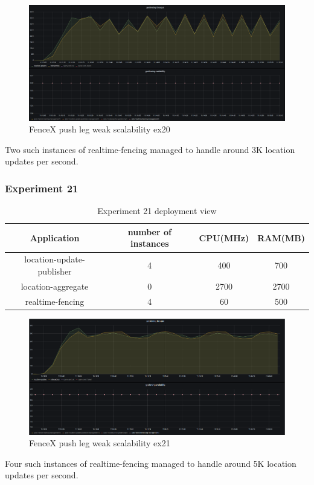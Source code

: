 \documentclass[a4]{report}
\begin{document}
    \begin{figure}[h!]
        \caption{FenceX push leg weak scalability ex20}
        \label{fig:ex20}
        \includegraphics[scale=0.4]{images/evaluation/ex20-benchmarking-ongoing-1per10sec.png}
    \end{figure}

    Two such instances of realtime-fencing managed to handle around 3K location updates per second.

    \clearpage

    \subsubsection{Experiment 21}
    \begin{table}[h!]
        \centering
        \begin{tabular}{|c|c|c|c|}
            \hline
            Application               & number of instances & CPU(MHz) & RAM(MB) \\
            \hline
            location-update-publisher & 4                   & 400      & 700     \\
            location-aggregate        & 0                   & 2700     & 2700    \\
            realtime-fencing          & 4                   & 60       & 500     \\
            \hline
        \end{tabular}
        \caption{Experiment 21 deployment view}
        \label{table:ex21-dv}
    \end{table}

    \begin{figure}[h!]
        \caption{FenceX push leg weak scalability ex21}
        \label{fig:ex21}
        \includegraphics[scale=0.4]{images/evaluation/ex21-benchmarking-ongoing-1per6sec.png}
    \end{figure}
    Four such instances of realtime-fencing managed to handle around 5K location updates per second.
\end{document}
